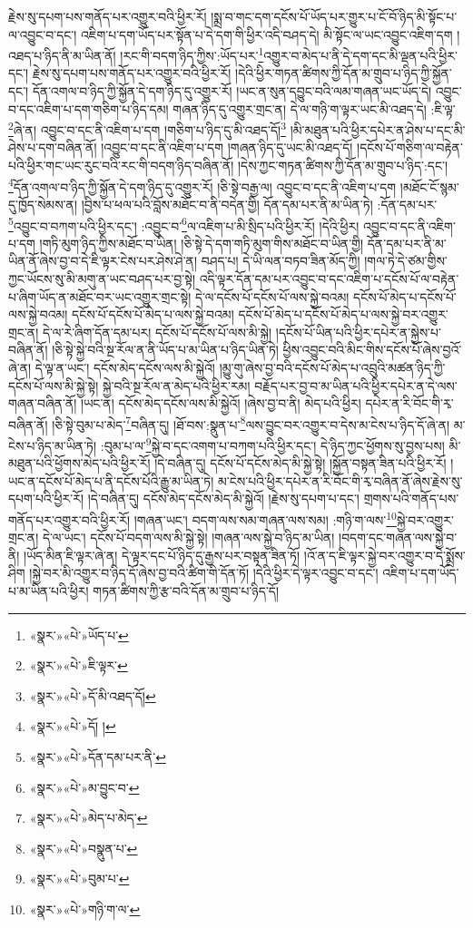 རྗེས་སུ་དཔག་པས་གནོད་པར་འགྱུར་བའི་ཕྱིར་རོ། །སྨྲ་བ་གང་དག་དངོས་པོ་ཡོད་པར་གྱུར་པ་ངོ་བོ་ཉིད་མི་སྟོང་པ་ལ་འབྱུང་བ་དང་། འཇིག་པ་དག་ཡོད་པར་སྟོན་པ་དེ་དག་གི་ཕྱིར་འདི་བཤད་དེ། མི་སྟོང་ལ་ཡང་འབྱུང་འཇིག་དག །འཐད་པ་ཉིད་ནི་མ་ཡིན་ནོ། །རང་གི་བདག་ཉིད་ཀྱིས་:ཡོད་པར་\footnote{«སྣར་»«པེ་»ཡོད་པ་}འགྱུར་བ་མེད་པ་ནི་དེ་དག་དང་མི་ལྡན་པའི་ཕྱིར་དང་། རྗེས་སུ་དཔག་པས་གནོད་པར་འགྱུར་བའི་ཕྱིར་རོ། །དེའི་ཕྱིར་གཏན་ཚིགས་ཀྱི་དོན་མ་གྲུབ་པ་ཉིད་ཀྱི་སྐྱོན་དང་། དོན་འགལ་བ་ཉིད་ཀྱི་སྐྱོན་དེ་དག་ཉིད་དུ་འགྱུར་རོ། །ཡང་ན་སུན་དབྱུང་བའི་ལམ་གཞན་ཡང་ཡོད་དེ། འབྱུང་བ་དང་འཇིག་པ་དག་གཅིག་པ་ཉིད་དམ། གཞན་ཉིད་དུ་འགྱུར་གྲང་ན། དེ་ལ་གཉི་ག་ལྟར་ཡང་མི་འཐད་དེ། :ཇི་ལྟ་\footnote{«སྣར་»«པེ་»ཇི་ལྟར་}ཞེ་ན། འབྱུང་བ་དང་ནི་འཇིག་པ་དག །གཅིག་པ་ཉིད་དུ་མི་འཐད་དོ།\footnote{«སྣར་»«པེ་»དོ་མི་འཐད་དོ།} །མི་མཐུན་པའི་ཕྱིར་དཔེར་ན་ཤེས་པ་དང་མི་ཤེས་པ་དག་བཞིན་ནོ། །འབྱུང་བ་དང་ནི་འཇིག་པ་དག །གཞན་ཉིད་དུ་ཡང་མི་འཐད་དོ། །དངོས་པོ་གཅིག་ལ་བརྟེན་པའི་ཕྱིར་གང་ཡང་རུང་བའི་རང་གི་བདག་ཉིད་བཞིན་ནོ། །དེས་ཀྱང་གཏན་ཚིགས་ཀྱི་དོན་མ་གྲུབ་པ་ཉིད་:དང་། \footnote{«སྣར་»«པེ་»དོ། ། }དོན་འགལ་བ་ཉིད་ཀྱི་སྐྱོན་དེ་དག་ཉིད་དུ་འགྱུར་རོ། །ཅི་སྟེ་བརྒྱ་ལ། འབྱུང་བ་དང་ནི་འཇིག་པ་དག །མཐོང་ངོ་སྙམ་དུ་ཁྱོད་སེམས་ན། །བྱིས་པ་ཕལ་པའི་བློས་མཐོང་བ་ནི་བདེན་གྱི། དོན་དམ་པར་ནི་མ་ཡིན་ཏེ། :དོན་དམ་པར་\footnote{«སྣར་»«པེ་»དོན་དམ་པར་ནི་}འབྱུང་བ་བཀག་པའི་ཕྱིར་དང་། :འབྱུང་བ་\footnote{«སྣར་»«པེ་»མ་བྱུང་བ་}ལ་འཇིག་པ་མི་སྲིད་པའི་ཕྱིར་རོ། །དེའི་ཕྱིར། འབྱུང་བ་དང་ནི་འཇིག་པ་དག །གཏི་མུག་ཉིད་ཀྱིས་མཐོང་བ་ཡིན། །ཅི་སྟེ་དེ་དག་གཏི་མུག་གིས་མཐོང་བ་ཡིན་གྱི། དོན་དམ་པར་ནི་མ་ཡིན་ནོ་ཞེས་བྱ་བ་དེ་ཇི་ལྟར་ངེས་པར་ཤེས་ཤེ་ན། བཤད་པ། དེ་ཡི་ལན་བཏབ་ཟིན་མོད་ཀྱི། །གལ་ཏེ་དེ་ཙམ་གྱིས་ཀྱང་ཡོངས་སུ་མི་མགུ་ན་ཡང་བཤད་པར་བྱ་སྟེ། འདི་ལྟར་དོན་དམ་པར་འབྱུང་བ་དང་འཇིག་པ་དངོས་པོ་ལ་བརྟེན་པ་ཞིག་ཡོད་ན་མཐོང་བར་ཡང་འགྱུར་གྲང་སྟེ། དེ་ལ་དངོས་པོ་དངོས་པོ་ལས་སྐྱེ་བའམ། དངོས་པོ་མེད་པ་དངོས་པོ་ལས་སྐྱེ་བའམ། དངོས་པོ་དངོས་པོ་མེད་པ་ལས་སྐྱེ་བའམ། དངོས་པོ་མེད་པ་དངོས་པོ་མེད་པ་ལས་སྐྱེ་བར་འགྱུར་གྲང་ན། དེ་ལ་རེ་ཞིག་དོན་དམ་པར། དངོས་པོ་དངོས་པོ་ལས་མི་སྐྱེ། །དངོས་པོ་ཡིན་པའི་ཕྱིར་དཔེར་ན་སྐྱེས་པ་བཞིན་ནོ། །ཅི་སྟེ་སྐྱེ་བའི་སྔ་རོལ་ན་ནི་ཡོད་པ་མ་ཡིན་པ་ཉིད་ཡིན་ཏེ། ཕྱིས་འབྱུང་བའི་མིང་གིས་དངོས་པོ་ཞེས་བྱའོ་ཞེ་ན། དེ་ལྟ་ན་ཡང་། དངོས་མེད་དངོས་ལས་མི་སྐྱེའོ། །མྱུ་གུ་ཞེས་བྱ་བའི་དངོས་པོ་མེད་པ་འབྲུའི་མཚན་ཉིད་ཀྱི་དངོས་པོ་ལས་མི་སྐྱེ་སྟེ། སྐྱེ་བའི་སྔ་རོལ་ན་མེད་པའི་ཕྱིར་རམ། བརྗོད་པར་བྱ་བ་མ་ཡིན་པའི་ཕྱིར་དཔེར་ན་དེ་ལས་གཞན་བཞིན་ནོ། །ཡང་ན། དངོས་མེད་དངོས་ལས་མི་སྐྱེའོ། །ཞེས་བྱ་བ་ནི། མེད་པའི་ཕྱིར། དཔེར་ན་རི་བོང་གི་རྭ་བཞིན་ནོ། །ཅི་སྟེ་བུམ་པ་མེད་\footnote{«སྣར་»«པེ་»མེད་པ་མེད་}བཞིན་དུ། །ཐོ་བས་:སྣུན་པ་\footnote{«སྣར་»«པེ་»བསྣུན་པ་}ལས་བྱུང་བར་འགྱུར་བ་དེས་མ་ངེས་པ་ཉིད་དོ་ཞེ་ན། མ་ངེས་པ་ཉིད་མ་ཡིན་ཏེ། :བུམ་པ་ལ་\footnote{«སྣར་»«པེ་»བུམ་པ་}སྐྱེ་བ་དང་འགག་པ་བཀག་པའི་ཕྱིར་དང་། དེ་ཉིད་ཀྱང་ཕྱོགས་སུ་བྱས་པས། མི་མཐུན་པའི་ཕྱོགས་མེད་པའི་ཕྱིར་རོ། །དེ་བཞིན་དུ། དངོས་པོ་དངོས་མེད་མི་སྐྱེ་སྟེ། །སྐྱོན་བསྟན་ཟིན་པའི་ཕྱིར་རོ། །ཡང་ན་དངོས་པོ་མེད་པ་ནི་དངོས་པོའི་རྒྱུ་མ་ཡིན་ཏེ། མ་ངེས་པའི་ཕྱིར་དཔེར་ན་རི་བོང་གི་རྭ་བཞིན་ནོ་ཞེས་རྗེས་སུ་དཔག་པའི་ཕྱིར་རོ། །དེ་བཞིན་དུ། དངོས་མེད་དངོས་མེད་མི་སྐྱེའོ། །རྗེས་སུ་དཔག་པ་དང་། གྲགས་པའི་གནོད་པས་གནོད་པར་འགྱུར་བའི་ཕྱིར་རོ། །གཞན་ཡང་། བདག་ལས་སམ་གཞན་ལས་སམ། :གཉི་ག་ལས་\footnote{«སྣར་»«པེ་»གཉི་ག་ལ་}སྐྱེ་བར་འགྱུར་གྲང་ན། དེ་ལ་ཡང་། དངོས་པོ་བདག་ལས་མི་སྐྱེ་སྟེ། །གཞན་ལས་སྐྱེ་བ་ཉིད་མ་ཡིན། །བདག་དང་གཞན་ལས་སྐྱེ་བ་ནི། །ཡོད་མིན་ཇི་ལྟར་ཞེ་ན། དེ་ལྟར་དང་པོ་ཉིད་དུ་རྒྱས་པར་བསྟན་ཟིན་ཏོ། །འོ་ན་ད་ཇི་ལྟར་སྐྱེ་བར་འགྱུར་བ་དེ་སྨྲོས་ཤིག །སྐྱེ་བར་མི་འགྱུར་བ་ཉིད་དོ་ཞེས་བྱ་བའི་ཚིག་གི་དོན་ཏོ། །དེའི་ཕྱིར་དེ་ལྟར་འབྱུང་བ་དང་། འཇིག་པ་དག་ཡོད་པ་མ་ཡིན་པའི་ཕྱིར། གཏན་ཚིགས་ཀྱི་རྩ་བའི་དོན་མ་གྲུབ་པ་ཉིད་དོ། 